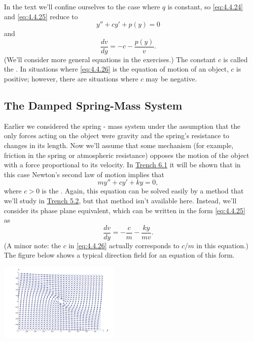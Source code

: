 \documentclass{ximera}
\begin{document}
In the text we'll confine ourselves to the case where $q$
is constant, so \eqref{eq:4.4.24} and \eqref{eq:4.4.25}  reduce to
\begin{equation} \label{eq:4.4.26}
y''+cy'+p(y)=0
\end{equation}
and
$$
\frac{dv}{dy}=-c-\frac{p(y)}{v}.
$$
(We'll consider more general equations in the exercises.) The constant
$c$ is called the . In situations where
\eqref{eq:4.4.26} is the equation of motion of an object, $c$ is positive;
however, there are situations where  $c$ may be negative.
 
\subsection*{The Damped Spring-Mass System}
 
Earlier we considered
the spring - mass system under the assumption that the only forces
acting on the object were gravity and the spring's resistance to
changes in its length. Now we'll assume that some mechanism (for
example, friction in the spring or atmospheric resistance) opposes the
motion of the object with a force proportional to its velocity. In \href{https://ximera.osu.edu/ode/main/springProblemsI/springProblemsI}{Trench 6.1} it will be shown that in this case Newton's
second law of motion implies that
\begin{equation} \label{eq:4.4.27}
my''+cy'+ky=0,
\end{equation}
where $c>0$ is the . Again, this
equation can
be solved easily by a method that we'll study in \href{https://ximera.osu.edu/ode/main/constantCoefficientHomogeneousEquations/constantCoefficientHomogeneousEquations}{Trench 5.2},
but that method isn't available here. Instead, we'll consider its
phase plane equivalent, which can be written in the form \eqref{eq:4.4.25}
as
\begin{equation} \label{eq:4.4.28}
\frac{dv}{dy}=-\frac{c}{m}-\frac{ky}{mv}.
\end{equation}
(A minor note: the $c$ in \eqref{eq:4.4.26} actually corresponds to
$c/m$ in this equation.) The figure below shows a
typical direction field for an equation of this form.
 
\begin{image}
 \includegraphics[height=1.5in]{fig040411.jpg}
\end{image}
 
\end{document}

